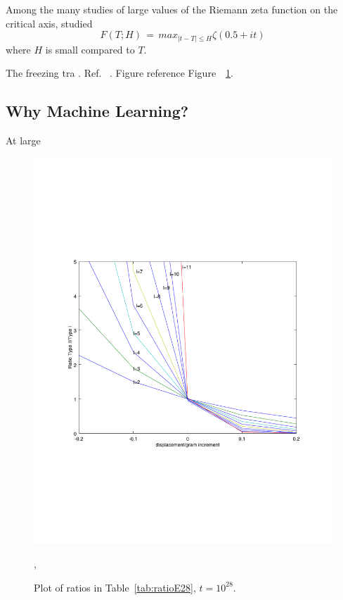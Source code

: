 \documentclass[twoside]{article}
\begin{document}
Among the many studies of large values of the Riemann zeta function on the critical axis, 
studied 
\begin{equation}
F(T; H)  \, = \, max_{|t-T| \le H} \zeta ( 0.5+it ) 
\label{eqRie}
\end{equation}
where $H$ is small compared to $T$. 

The freezing tra . Ref.~ \cite{osneural,Shanker 2018a,osentropy}. Figure reference Figure~~\ref{fig:ratioE28}.

\subsection{\label{secwhy}Why Machine Learning?}

At large 

\begin{figure}
\includegraphics[width=1.0\textwidth]{typeIIratio.pdf}
\caption[]{ 
 Plot of  ratios in  Table~\ref{tab:ratioE28},  $t = 10^{28}$.
 }
\vspace{1mm}, 
\label{fig:ratioE28}
\end{figure}
\end{document}
